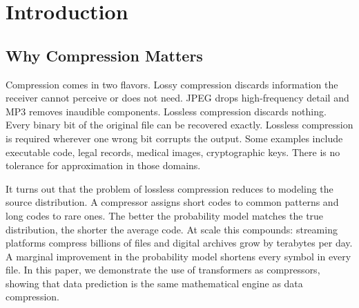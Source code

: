 \documentclass[onecolumn,english,12pt]{IEEEtran}
\theoremstyle{plain}
\theoremstyle{plain}
\theoremstyle{plain}
\theoremstyle{definition}
\begin{document}
\begin{abstract}
H{\o}st-Madsen et al.~\cite{HostMadsen24} discussed that a learned source coder's
redundancy decays as $1/m$ in the number of training sequences, demonstrating that
offline training can beat universal online coders once $m$ is large enough.
This paper empirically tests that prediction using a small transformer
(minGPT-nano, $\sim$0.11M parameters) as a sequential probability estimator
coupled with arithmetic coding, benchmarked against the Laplace estimator and
Context Tree Weighting (CTW) across IID binary, Markov, and FSM sources.
On IID sources, a general transformer trained across the full source distribution
recovers the Laplace estimator from data alone. A specialized transformer
crosses below the Laplace redundancy at around $m = 100$ training sequences.
On structured sources the advantage of offline training widens. The specialized
transformer beats both Laplace and CTW at all sequence lengths on the FSM
source, with CTW closing the gap steadily.
The results emphasize that learned and universal compression operate on the same
mathematical engine of sequential prediction, and that offline knowledge of the
source distribution is the mechanism by which a learned coder earns its advantage.
\end{abstract}

\section{Introduction}
\label{sec:intro}

\subsection{Why Compression Matters}
\label{sec:why}

Compression comes in two flavors. Lossy compression discards information
the receiver cannot perceive or does not need. JPEG drops high-frequency
detail and MP3 removes inaudible components. Lossless compression discards
nothing. Every binary bit of the original file can be recovered exactly. Lossless compression
is required wherever one wrong bit corrupts the output. Some examples include executable code,
legal records, medical images, cryptographic keys. There is no tolerance
for approximation in those domains.

It turns out that the problem of lossless compression reduces to modeling the source distribution. A
compressor assigns short codes to common patterns and long codes to rare
ones. The better the probability model matches the true distribution,
the shorter the average code. At scale this compounds: streaming
platforms compress billions of files and digital archives grow by
terabytes per day. A marginal improvement in the probability model
shortens every symbol in every file. In this paper, we demonstrate the use of transformers as compressors, showing that data prediction is the same mathematical engine as data compression.
\end{document}
